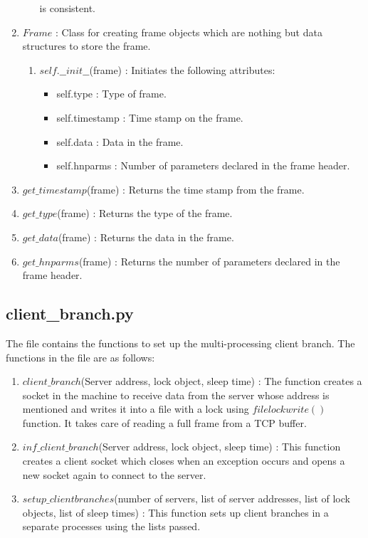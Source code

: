 \begin{enumerate}
\begin{enumerate}
				is consistent.
		\end{enumerate}
	\item $Frame$ : Class for creating frame objects which are nothing but data
		structures to store the frame.
		\begin{enumerate}
			\item $self.\_\_init\_\_$(frame) : Initiates the following attributes:
				\begin{itemize}
					\item self.type : Type of frame.
					\item self.timestamp : Time stamp on the frame.
					\item self.data : Data in the frame.
					\item self.hnparms : Number of parameters declared in the
						frame header.
				\end{itemize}
		\end{enumerate}
	\item $get\_timestamp$(frame) : Returns the time stamp from the frame.
	\item $get\_type$(frame) : Returns the type of the frame.
	\item $get\_data$(frame) : Returns the data in the frame.
	\item $get\_hnparms$(frame) : Returns the number of parameters declared in
		the frame header.
\end{enumerate}


\subsection{client\_branch.py}
The file contains the functions to set up the multi-processing client branch.
The functions in the file are as follows:
\begin{enumerate}
	\item $client\_branch$(Server address, lock object, sleep time) : The
		function creates a socket in the machine to receive data from the
		server whose address is mentioned and writes it into a file with a
		lock using $filelockwrite()$ function. It takes care of reading a full
		frame from a TCP buffer.
	\item $inf\_client\_branch$(Server address, lock object, sleep time) : This
		function creates a client socket which closes when an exception occurs
		and opens a new socket again to connect to the server.
	\item $setup\_clientbranches$(number of servers, list of server addresses,
		list of lock objects, list of sleep times) : This function sets up
		client branches in a separate processes using the lists passed.
\end{enumerate}


